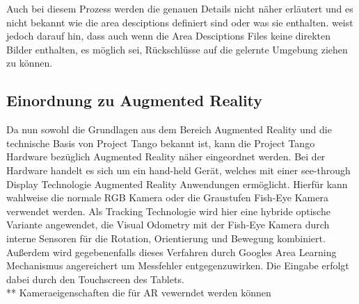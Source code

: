 Auch bei diesem Prozess werden die genauen Details nicht näher erläutert und es nicht bekannt wie die area desciptions definiert sind oder was sie enthalten. \citep{GoogleDevelopersConcepts:online} weist jedoch darauf hin, dass auch wenn die Area Desciptions Files keine direkten Bilder enthalten, es möglich sei, Rückschlüsse auf die gelernte Umgebung ziehen zu können. \\

\subsection{Einordnung zu Augmented Reality}

Da nun sowohl die Grundlagen aus dem Bereich Augmented Reality und die technische Basis von Project Tango bekannt ist, kann die Project Tango Hardware bezüglich Augmented Reality näher eingeordnet werden. Bei der Hardware handelt es sich um ein hand-held Gerät, welches mit einer see-through Display Technologie Augmented Reality Anwendungen ermöglicht. Hierfür kann wahlweise die normale RGB Kamera oder die Graustufen Fish-Eye Kamera verwendet werden. Als Tracking Technologie wird hier eine hybride optische Variante angewendet, die Visual Odometry mit der Fish-Eye Kamera durch interne Sensoren für die Rotation, Orientierung und Bewegung kombiniert. Außerdem wird gegebenenfalls dieses Verfahren durch Googles Area Learning Mechanismus angereichert um Messfehler entgegenzuwirken. Die Eingabe erfolgt dabei durch den Touchscreen des Tablets. \\

** Kameraeigenschaften die für AR vewerndet werden können
